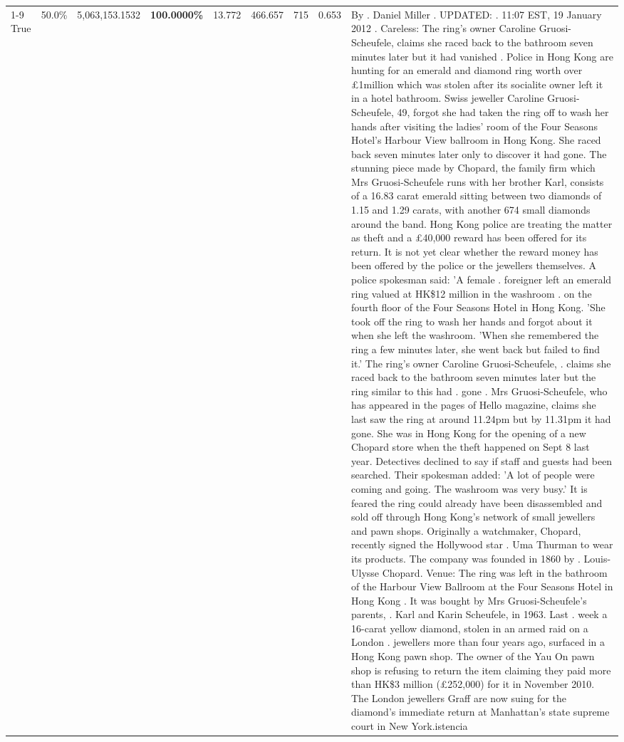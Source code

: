 \begin{table}[H]
\begin{tabular}{lllrlllll}
\cline{1-9}
True & 50.0\% & 5,063,153.1532 & \bfseries \color{red} 100.0000\% & 13.772 & 466.657 & 715 & 0.653 & By . Daniel Miller . UPDATED: . 11:07 EST, 19 January 2012 . Careless: The ring's owner Caroline Gruosi-Scheufele, claims she raced back to the bathroom seven minutes later but it had vanished . Police in Hong Kong are hunting for an emerald and diamond ring worth over £1million which was stolen after its socialite owner left it in a hotel bathroom. Swiss jeweller Caroline Gruosi-Scheufele, 49, forgot she had taken the ring off to wash her hands after visiting the ladies' room of the Four Seasons Hotel's Harbour View ballroom in Hong Kong. She raced back seven minutes later only to discover it had gone. The stunning piece made by Chopard, the family firm which Mrs Gruosi-Scheufele runs with her brother Karl, consists of a 16.83 carat emerald sitting between two diamonds of 1.15 and 1.29 carats, with another 674 small diamonds around the band. Hong Kong police are treating the matter as theft and a £40,000 reward has been offered for its return. It is not yet clear whether the reward money has been offered by the police or the jewellers themselves. A police spokesman said: 'A female . foreigner left an emerald ring valued at HK\$12 million in the washroom . on the fourth floor of the Four Seasons Hotel in Hong Kong. 'She took off the ring to wash her hands and forgot about it when she left the washroom. 'When she remembered the ring a few minutes later, she went back but failed to find it.' The ring's owner Caroline Gruosi-Scheufele, . claims she raced back to the bathroom seven minutes later but the ring similar to this had . gone . Mrs Gruosi-Scheufele, who has appeared in the pages of Hello magazine, claims she last saw the ring at around 11.24pm but by 11.31pm it had gone. She was in Hong Kong for the opening of a new Chopard store when the theft happened on Sept 8 last year. Detectives declined to say if staff and guests had been searched. Their spokesman added: 'A lot of people were coming and going. The washroom was very busy.' It is feared the ring could already have been disassembled and sold off through Hong Kong's network of small jewellers and pawn shops. Originally a watchmaker, Chopard, recently signed the Hollywood star . Uma Thurman to wear its products. The company was founded in 1860 by . Louis-Ulysse Chopard. Venue: The ring was left in the bathroom of the Harbour View Ballroom at the Four Seasons Hotel in Hong Kong . It was bought by Mrs Gruosi-Scheufele's  parents, . Karl and Karin Scheufele, in 1963. Last . week a 16-carat yellow diamond, stolen in an armed raid on a London . jewellers more than four years ago, surfaced in a Hong Kong pawn shop. The owner of the Yau On pawn shop is refusing to return the item claiming they paid more than HK\$3 million (£252,000) for it in November 2010. The London jewellers Graff are now suing for the diamond’s immediate return at Manhattan’s state supreme court in New York.istencia \\

\end{tabular}
\end{table}
